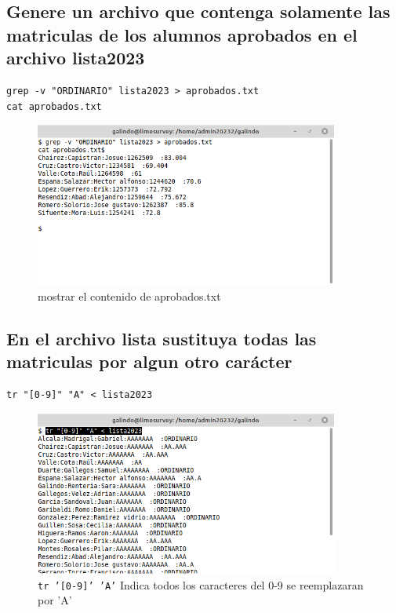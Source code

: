 \documentclass[11pt]{article}
\begin{document}
\subsection{Genere un archivo que contenga solamente las matriculas de los alumnos aprobados en el archivo lista2023}
\label{sec:org4f944b3}
\begin{verbatim}
grep -v "ORDINARIO" lista2023 > aprobados.txt
cat aprobados.txt
\end{verbatim}

\begin{figure}[htbp]
\centering
\includegraphics[width=10cm]{img/9.png}
\caption{mostrar el contenido de aprobados.txt}
\end{figure}

\pagebreak

\subsection{En el archivo lista sustituya todas las matriculas por algun otro carácter}
\label{sec:org37a46f0}

\begin{verbatim}
tr "[0-9]" "A" < lista2023
\end{verbatim}

\begin{figure}[htbp]
\centering
\includegraphics[width=10cm]{img/10.png}
\caption[\texttt{tr '[0-9]' 'A'}]{\texttt{tr '[0-9]' 'A'} Indica todos los caracteres del 0-9 se reemplazaran por 'A'}
\end{figure}
\end{document}
